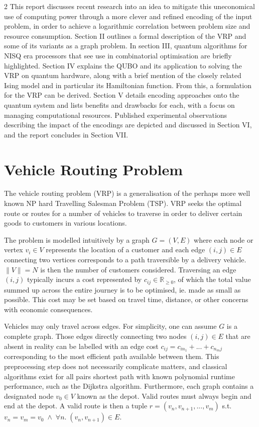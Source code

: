 \documentclass [10pt]{article}
\newcommand {\qnorm}[1] {\lVert #1 \rVert}
\begin{document}
\begin {multicols}{2}
This report discusses recent research into an idea to mitigate this
uneconomical use of computing power through a more clever and refined 
encoding of the input problem, in order to achieve a logarithmic correlation
between problem size and resource consumption.
Section II outlines a formal description of the VRP and some of its variants
as a graph problem.
In section III, quantum algorithms for NISQ era processors that see use in
combinatorial optimisation are briefly highlighted.
Section IV explains the QUBO and its application to solving the VRP on
quantum hardware, along with a brief mention of the closely related
Ising model and in particular its Hamiltonian function. From this, a
formulation for the VRP can be derived.
Section V details encoding approaches onto the quantum system and lists
benefits and drawbacks for each, with a focus on managing computational
resources.
Published experimental observations describing the impact of the encodings
are depicted and discussed in Section VI,
and the report concludes in Section VII.

\section {Vehicle Routing Problem}
The vehicle routing problem (VRP) is a generalisation of the perhaps more
well known NP hard Travelling Salesman Problem (TSP). VRP seeks the optimal
route or routes for a number of vehicles to traverse in order to deliver
certain goods to customers in various locations.

The problem is modelled intuitively by a graph $G = (V, E)$
where each node or vertex $v_i \in V$ represents the location of a customer 
and each edge $(i, j) \in E$ connecting two vertices corresponds to a path
traversible by a delivery vehicle. $\qnorm{V} = N$ is then the number
of customers considered. Traversing an edge $(i, j)$ typically incurs
a cost represented by $c_{ij} \in \mathbb R_{\ge 0}$, of which the total
value summed up across the entire journey is to be optimised, ie. made as
small as possible. This cost may be set based on travel time, distance,
or other concerns with economic consequences.

Vehicles may only travel across edges. For simplicity, one can assume $G$ is
a complete graph. Those edges directly connecting two nodes $(i, j) \in E$
that are absent in reality can be labelled with an edge cost
$c_{ij} = c_{i n_1} + ... + c_{n_m j}$ corresponding to
the most efficient path available between them. This preprocessing step does
not necessarily complicate matters, and classical algorithms exist for all
pairs shortest path with known polynomial runtime performance, such as
the Dijkstra algorithm. Furthermore, each graph contains a
designated node $v_0 \in V$ known as the depot. Valid routes must always
begin and end at the depot. A valid route is then a tuple
$r = (v_n, v_{n+1}, ..., v_m)$ s.t.
$v_n = v_m = v_0 \; \land \; \forall n. \; (v_n, v_{n+1}) \in E$.


\end{multicols}
\end{document}
